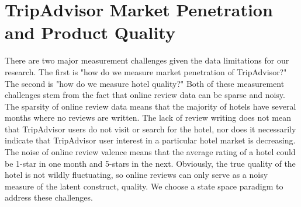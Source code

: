 \documentclass[12pt, leqno]{article}
\begin{document}
\section*{TripAdvisor Market Penetration and Product Quality} \label{sec:crosssection}

There are two major measurement challenges given the data limitations for our research. The first is "how do we measure market penetration of TripAdvisor?" The second is "how do we measure hotel quality?" Both of these measurement challenges stem from the fact that online review data can be sparse and noisy. The sparsity of online review data means that the majority of hotels have several months where no reviews are written. The lack of review writing does not mean that TripAdvisor users do not visit or search for the hotel, nor does it necessarily indicate that TripAdvisor user interest in a particular hotel market is decreasing. The noise of online review valence means that the average rating of a hotel could be 1-star in one month and 5-stars in the next. Obviously, the true quality of the hotel is not wildly fluctuating, so online reviews can only serve as a noisy measure of the latent construct, quality. We choose a state space paradigm to address these challenges. 
\end{document}
